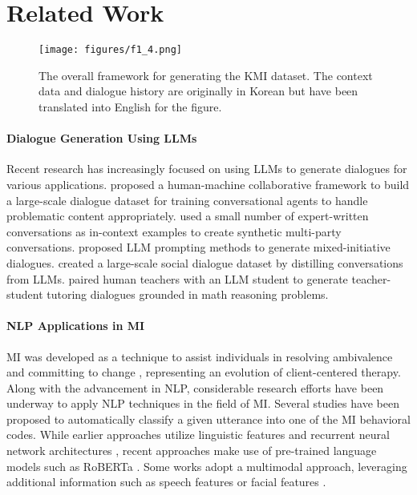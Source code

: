 \section{Related Work}
\label{sec:related_work}

\begin{figure*}[htb!]
    \centering 
    \texttt{[image: figures/f1\_4.png]}
    \caption{The overall framework for generating the KMI dataset. The context data and dialogue history are originally in Korean but have been translated into English for the figure.} 
    \label{fig:framework}
\end{figure*}


\paragraph{Dialogue Generation Using LLMs}
Recent research has increasingly focused on using LLMs to generate dialogues for various applications.
\citet{kim2022prosocialdialog} proposed a human-machine collaborative framework to build a large-scale dialogue dataset for training conversational agents to handle problematic content appropriately.
\citet{chen2023places} used a small number of expert-written conversations as in-context examples to create synthetic multi-party conversations.
\citet{chen2023controllable} proposed LLM prompting methods to generate mixed-initiative dialogues.
\citet{kim2023soda} created a large-scale social dialogue dataset by distilling conversations from LLMs.
\citet{macina2023mathdial} paired human teachers with an LLM student to generate teacher-student tutoring dialogues grounded in math reasoning problems.



\paragraph{NLP Applications in MI}
MI was developed as a technique to assist individuals in resolving ambivalence and committing to change \citep{Miller_1983}, representing an evolution of client-centered therapy. 
Along with the advancement in NLP, considerable research efforts have been underway to apply NLP techniques in the field of MI. 
Several studies have been proposed to automatically classify a given utterance into one of the MI behavioral codes.
While earlier approaches utilize linguistic features \citep{perez2017predicting} and recurrent neural network architectures \citep{tanana2015recursive, xiao2016behavioral, cao2019observing, gibson2019multi}, recent approaches make use of pre-trained language models such as RoBERTa \citep{liu2019roberta, tavabi2021analysis, welivita2023boosting}. 
Some works adopt a multimodal approach, leveraging additional information such as speech features \citep{tavabi2020multimodal} or facial features \citep{nakano2022detecting}.



